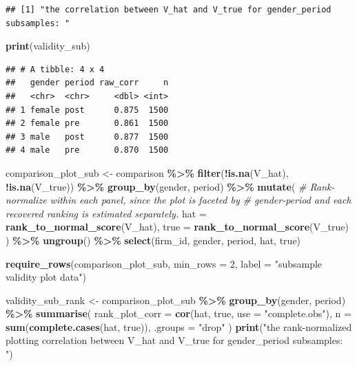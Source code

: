\documentclass[
]{article}
\newenvironment{Shaded}{\begin{snugshade}}{\end{snugshade}}
\newcommand{\AttributeTok}[1]{\textcolor[rgb]{0.13,0.29,0.53}{#1}}
\newcommand{\CommentTok}[1]{\textcolor[rgb]{0.56,0.35,0.01}{\textit{#1}}}
\newcommand{\DecValTok}[1]{\textcolor[rgb]{0.00,0.00,0.81}{#1}}
\newcommand{\FunctionTok}[1]{\textcolor[rgb]{0.13,0.29,0.53}{\textbf{#1}}}
\newcommand{\NormalTok}[1]{#1}
\newcommand{\OtherTok}[1]{\textcolor[rgb]{0.56,0.35,0.01}{#1}}
\newcommand{\SpecialCharTok}[1]{\textcolor[rgb]{0.81,0.36,0.00}{\textbf{#1}}}
\newcommand{\StringTok}[1]{\textcolor[rgb]{0.31,0.60,0.02}{#1}}
\begin{document}
\begin{verbatim}
## [1] "the correlation between V_hat and V_true for gender_period subsamples: "
\end{verbatim}

\begin{Shaded}
\begin{Highlighting}[]
\FunctionTok{print}\NormalTok{(validity\_sub)}
\end{Highlighting}
\end{Shaded}

\begin{verbatim}
## # A tibble: 4 x 4
##   gender period raw_corr     n
##   <chr>  <chr>     <dbl> <int>
## 1 female post      0.875  1500
## 2 female pre       0.861  1500
## 3 male   post      0.877  1500
## 4 male   pre       0.870  1500
\end{verbatim}

\begin{Shaded}
\begin{Highlighting}[]
\NormalTok{comparison\_plot\_sub }\OtherTok{\textless{}{-}}\NormalTok{ comparison }\SpecialCharTok{\%\textgreater{}\%}
    \FunctionTok{filter}\NormalTok{(}\SpecialCharTok{!}\FunctionTok{is.na}\NormalTok{(V\_hat), }\SpecialCharTok{!}\FunctionTok{is.na}\NormalTok{(V\_true)) }\SpecialCharTok{\%\textgreater{}\%}
    \FunctionTok{group\_by}\NormalTok{(gender, period) }\SpecialCharTok{\%\textgreater{}\%}
    \FunctionTok{mutate}\NormalTok{(}
        \CommentTok{\# Rank{-}normalize within each panel, since the plot is faceted by}
        \CommentTok{\# gender{-}period and each recovered ranking is estimated separately.}
        \AttributeTok{hat =} \FunctionTok{rank\_to\_normal\_score}\NormalTok{(V\_hat),}
        \AttributeTok{true =} \FunctionTok{rank\_to\_normal\_score}\NormalTok{(V\_true)}
\NormalTok{    ) }\SpecialCharTok{\%\textgreater{}\%}
    \FunctionTok{ungroup}\NormalTok{() }\SpecialCharTok{\%\textgreater{}\%}
    \FunctionTok{select}\NormalTok{(firm\_id, gender, period, hat, true)}

\FunctionTok{require\_rows}\NormalTok{(comparison\_plot\_sub, }\AttributeTok{min\_rows =} \DecValTok{2}\NormalTok{, }\AttributeTok{label =} \StringTok{"subsample validity plot data"}\NormalTok{)}

\NormalTok{validity\_sub\_rank }\OtherTok{\textless{}{-}}\NormalTok{ comparison\_plot\_sub }\SpecialCharTok{\%\textgreater{}\%}
    \FunctionTok{group\_by}\NormalTok{(gender, period) }\SpecialCharTok{\%\textgreater{}\%}
    \FunctionTok{summarise}\NormalTok{(}
        \AttributeTok{rank\_plot\_corr =} \FunctionTok{cor}\NormalTok{(hat, true, }\AttributeTok{use =} \StringTok{"complete.obs"}\NormalTok{),}
        \AttributeTok{n =} \FunctionTok{sum}\NormalTok{(}\FunctionTok{complete.cases}\NormalTok{(hat, true)),}
        \AttributeTok{.groups =} \StringTok{"drop"}
\NormalTok{    )}
\FunctionTok{print}\NormalTok{(}\StringTok{"the rank{-}normalized plotting correlation between V\_hat and V\_true for gender\_period subsamples: "}\NormalTok{)}
\end{Highlighting}
\end{Shaded}
\end{document}
